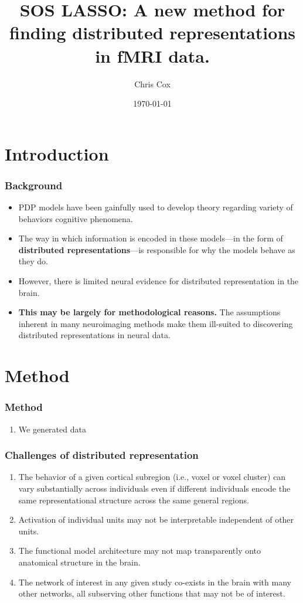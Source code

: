 \documentclass{beamer}
\title[SOS LASSO]{SOS LASSO: A new method for finding distributed representations in fMRI data.}
\author{Chris Cox}
\institute{University of Wisconsin, Madison}
\date{\today}
\begin{document}
\begin{frame}
\titlepage
\end{frame}


\section{Introduction}

\begin{frame}
\frametitle{Background}
\begin{itemize}
\item PDP models have been gainfully used to develop theory regarding variety of behaviors cognitive phenomena. 
\item The way in which information is encoded in these models---in the form of {\bf distributed representations}---is responsible for why the models behave as they do.
\item However, there is limited neural evidence for distributed representation in the brain.
\item {\bf This may be largely for methodological reasons.} The assumptions inherent in many neuroimaging methods make them ill-suited to discovering distributed representations in neural data.
\end{itemize}
\end{frame}

\section{Method}
\begin{frame}
\frametitle{Method}
\begin{enumerate}
\item We generated data 
\end{enumerate}
\end{frame}

\begin{frame}
\frametitle{Challenges of distributed representation}
\begin{enumerate}
  \item The behavior of a given cortical subregion (i.e., voxel or voxel cluster) can vary substantially across individuals even if different individuals encode the same representational structure across the same general regions.
  \pause
  \item Activation of individual units may not be interpretable independent of other units.
  \pause
  \item The functional model architecture may not map transparently onto anatomical structure in the brain.
  \pause
  \item The network of interest in any given study co-exists in the brain with many other networks, all subserving other functions that may not be of interest.
\end{enumerate}
\end{frame}
\end{document}

